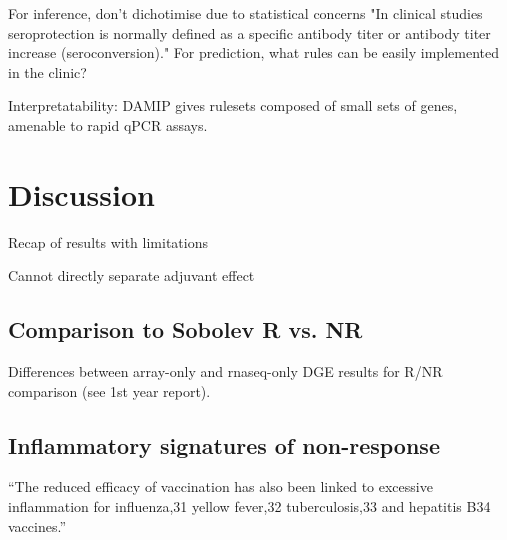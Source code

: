 \begin{outline}

\1 For inference, don't dichotimise due to statistical concerns
    \2 "In clinical studies seroprotection is normally defined as a specific antibody titer or antibody titer increase (seroconversion)."
    \2 For prediction, what rules can be easily implemented in the clinic?

\1 Interpretatability: DAMIP gives rulesets composed of small sets of genes, amenable to rapid qPCR assays.

\end{outline}

\section{Discussion}

Recap of results with limitations
\begin{outline}
\1 Cannot directly separate adjuvant effect
\end{outline}

\subsection{Comparison to Sobolev R vs. NR}

Differences between array-only and rnaseq-only DGE results for R/NR comparison (see 1st year report).

\subsection{Inflammatory signatures of non-response}

\enquote{The reduced efficacy of vaccination has also been linked to excessive inflammation for influenza,31 yellow fever,32 tuberculosis,33 and hepatitis B34 vaccines.}

